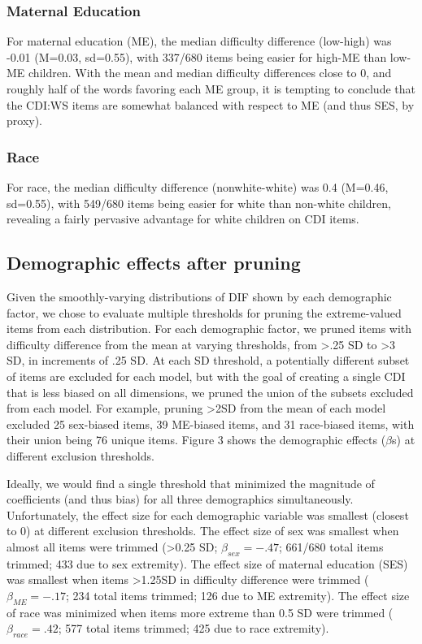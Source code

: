 \documentclass[10pt, letterpaper]{article}
\begin{document}
\hypertarget{maternal-education}{%
\subsubsection{Maternal Education}\label{maternal-education}}

For maternal education (ME), the median difficulty difference (low-high)
was -0.01 (M=0.03, sd=0.55), with 337/680 items being easier for high-ME
than low-ME children. With the mean and median difficulty differences
close to 0, and roughly half of the words favoring each ME group, it is
tempting to conclude that the CDI:WS items are somewhat balanced with
respect to ME (and thus SES, by proxy).

\hypertarget{race}{%
\subsubsection{Race}\label{race}}

For race, the median difficulty difference (nonwhite-white) was 0.4
(M=0.46, sd=0.55), with 549/680 items being easier for white than
non-white children, revealing a fairly pervasive advantage for white
children on CDI items.

\hypertarget{demographic-effects-after-pruning}{%
\subsection{Demographic effects after
pruning}\label{demographic-effects-after-pruning}}

Given the smoothly-varying distributions of DIF shown by each
demographic factor, we chose to evaluate multiple thresholds for pruning
the extreme-valued items from each distribution. For each demographic
factor, we pruned items with difficulty difference from the mean at
varying thresholds, from \textgreater.25 SD to \textgreater3 SD, in
increments of .25 SD. At each SD threshold, a potentially different
subset of items are excluded for each model, but with the goal of
creating a single CDI that is less biased on all dimensions, we pruned
the union of the subsets excluded from each model. For example, pruning
\textgreater2SD from the mean of each model excluded 25 sex-biased
items, 39 ME-biased items, and 31 race-biased items, with their union
being 76 unique items. Figure 3 shows the demographic effects
(\(\beta\)s) at different exclusion thresholds.

Ideally, we would find a single threshold that minimized the magnitude
of coefficients (and thus bias) for all three demographics
simultaneously. Unfortunately, the effect size for each demographic
variable was smallest (closest to 0) at different exclusion thresholds.
The effect size of sex was smallest when almost all items were trimmed
(\textgreater0.25 SD; \(\beta_{sex} = -.47\); 661/680 total items
trimmed; 433 due to sex extremity). The effect size of maternal
education (SES) was smallest when items \textgreater1.25SD in difficulty
difference were trimmed (\(\beta_{ME} = -.17\); 234 total items trimmed;
126 due to ME extremity). The effect size of race was minimized when
items more extreme than 0.5 SD were trimmed (\(\beta_{race} = .42\); 577
total items trimmed; 425 due to race extremity).
\end{document}
